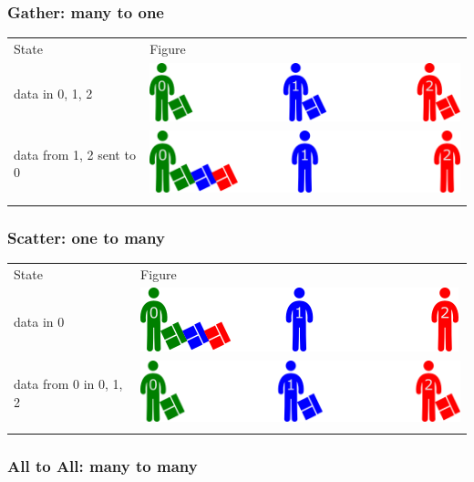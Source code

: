 \subsubsection{Gather: many to one}\label{gather-many-to-one}

\begin{longtable}[c]{@{}ll@{}}
\toprule\addlinespace
State & Figure
\\\addlinespace
\midrule\endhead
data in 0, 1, 2 & \includegraphics{06MPI/figures/collective.png}
\\\addlinespace
data from 1, 2 sent to 0 & \includegraphics{06MPI/figures/gather1.png}
\\\addlinespace
\bottomrule
\end{longtable}

\subsubsection{Scatter: one to many}\label{scatter-one-to-many}

\begin{longtable}[c]{@{}ll@{}}
\toprule\addlinespace
State & Figure
\\\addlinespace
\midrule\endhead
data in 0 & \includegraphics{06MPI/figures/gather1.png}
\\\addlinespace
data from 0 in 0, 1, 2 & \includegraphics{06MPI/figures/collective.png}
\\\addlinespace
\bottomrule
\end{longtable}

\subsubsection{All to All: many to many}\label{all-to-all-many-to-many}

